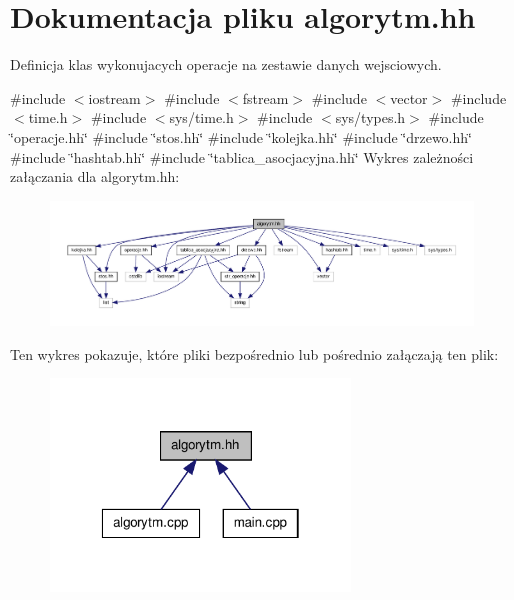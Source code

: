 \hypertarget{algorytm_8hh}{\section{\-Dokumentacja pliku algorytm.\-hh}
\label{algorytm_8hh}
}


\-Definicja klas wykonujacych operacje na zestawie danych wejsciowych.  


{\ttfamily \#include $<$iostream$>$}\*
{\ttfamily \#include $<$fstream$>$}\*
{\ttfamily \#include $<$vector$>$}\*
{\ttfamily \#include $<$time.\-h$>$}\*
{\ttfamily \#include $<$sys/time.\-h$>$}\*
{\ttfamily \#include $<$sys/types.\-h$>$}\*
{\ttfamily \#include \char`\"{}operacje.\-hh\char`\"{}}\*
{\ttfamily \#include \char`\"{}stos.\-hh\char`\"{}}\*
{\ttfamily \#include \char`\"{}kolejka.\-hh\char`\"{}}\*
{\ttfamily \#include \char`\"{}drzewo.\-hh\char`\"{}}\*
{\ttfamily \#include \char`\"{}hashtab.\-hh\char`\"{}}\*
{\ttfamily \#include \char`\"{}tablica\-\_\-asocjacyjna.\-hh\char`\"{}}\*
\-Wykres zależności załączania dla algorytm.\-hh\-:\nopagebreak
\begin{figure}[H]
\begin{center}
\leavevmode
\includegraphics[width=350pt]{algorytm_8hh__incl}
\end{center}
\end{figure}
\-Ten wykres pokazuje, które pliki bezpośrednio lub pośrednio załączają ten plik\-:\nopagebreak
\begin{figure}[H]
\begin{center}
\leavevmode
\includegraphics[width=226pt]{algorytm_8hh__dep__incl}
\end{center}
\end{figure}
